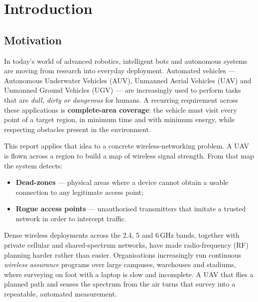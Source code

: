 
\chapter{Introduction}

\section{Motivation}
In today's world of advanced robotics, intelligent bots and autonomous
systems are moving from research into everyday deployment. Automated vehicles ---
Autonomous Underwater Vehicles (AUV), Unmanned Aerial Vehicles (UAV) and Unmanned
Ground Vehicles (UGV) --- are increasingly used to perform tasks that are
\emph{dull, dirty or dangerous} for humans. A recurring requirement across these
applications is \textbf{complete-area coverage}: the vehicle must visit every
point of a target region, in minimum time and with minimum energy, while
respecting obstacles present in the environment.

This report applies that idea to a concrete wireless-networking problem. A UAV is
flown across a region to build a map of wireless signal strength. From that map
the system detects:
\begin{itemize}
  \item \textbf{Dead-zones} --- physical areas where a device cannot obtain a
        usable connection to any legitimate access point;
  \item \textbf{Rogue access points} --- unauthorised transmitters that imitate a
        trusted network in order to intercept traffic.
\end{itemize}

Dense wireless deployments across the 2.4, 5 and 6\,GHz bands, together with
private cellular and shared-spectrum networks, have made radio-frequency (RF)
planning harder rather than easier. Organisations increasingly run continuous
\emph{wireless assurance} programs over large campuses, warehouses and stadiums,
where surveying on foot with a laptop is slow and incomplete. A UAV that flies a
planned path and senses the spectrum from the air turns that survey into a
repeatable, automated measurement.

